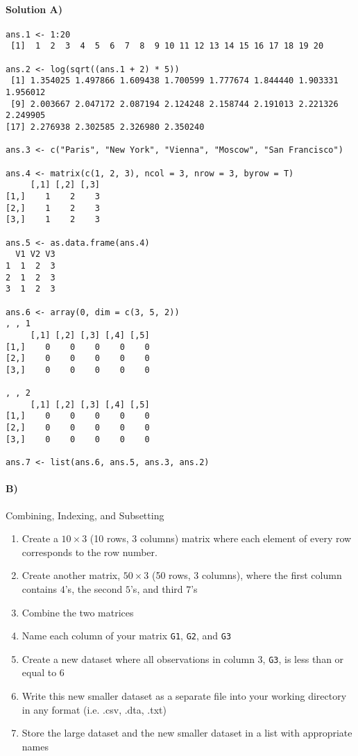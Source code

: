 \documentclass[10pt]{article}
\begin{document}
\paragraph{Solution A)}
\begin{verbatim}
ans.1 <- 1:20
 [1]  1  2  3  4  5  6  7  8  9 10 11 12 13 14 15 16 17 18 19 20

ans.2 <- log(sqrt((ans.1 + 2) * 5))
 [1] 1.354025 1.497866 1.609438 1.700599 1.777674 1.844440 1.903331 1.956012
 [9] 2.003667 2.047172 2.087194 2.124248 2.158744 2.191013 2.221326 2.249905
[17] 2.276938 2.302585 2.326980 2.350240

ans.3 <- c("Paris", "New York", "Vienna", "Moscow", "San Francisco")

ans.4 <- matrix(c(1, 2, 3), ncol = 3, nrow = 3, byrow = T)
     [,1] [,2] [,3]
[1,]    1    2    3
[2,]    1    2    3
[3,]    1    2    3

ans.5 <- as.data.frame(ans.4)
  V1 V2 V3
1  1  2  3
2  1  2  3
3  1  2  3

ans.6 <- array(0, dim = c(3, 5, 2))
, , 1
     [,1] [,2] [,3] [,4] [,5]
[1,]    0    0    0    0    0
[2,]    0    0    0    0    0
[3,]    0    0    0    0    0

, , 2
     [,1] [,2] [,3] [,4] [,5]
[1,]    0    0    0    0    0
[2,]    0    0    0    0    0
[3,]    0    0    0    0    0

ans.7 <- list(ans.6, ans.5, ans.3, ans.2)

\end{verbatim}


\paragraph{B)} Combining, Indexing, and Subsetting

\begin{enumerate}
\item Create a $10 \times 3$ (10 rows, 3 columns) matrix where each element of every row corresponds to the row number.
\item Create another matrix, $50 \times 3$ (50 rows, 3 columns), where the first column contains $4$'s, the second $5$'s, and third $7$'s
\item Combine the two matrices
\item Name each column of your matrix \texttt{G1}, \texttt{G2}, and \texttt{G3}
\item Create a new dataset where all observations in column 3, \texttt{G3}, is less than or equal to 6
\item Write this new smaller dataset as a separate file into your working directory in any format (i.e. .csv, .dta, .txt)
\item Store the large dataset and the new smaller dataset in a list with appropriate names
\end{enumerate}
\end{document}
